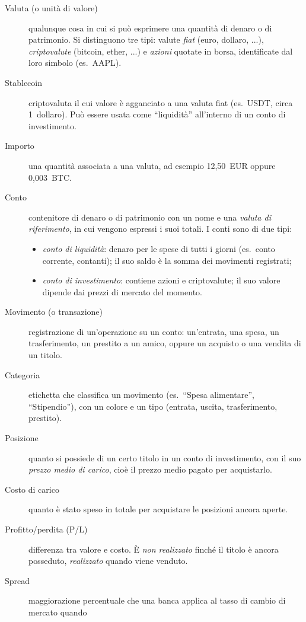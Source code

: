 \documentclass[11pt,a4paper,openright]{report}
\begin{document}
\begin{description}
  \item[Valuta (o unità di valore)] qualunque cosa in cui si può esprimere una quantità di denaro o di
  patrimonio. Si distinguono tre tipi: valute \emph{fiat} (euro, dollaro, ...), \emph{criptovalute}
  (bitcoin, ether, ...) e \emph{azioni} quotate in borsa, identificate dal loro simbolo (es.\ AAPL).
  \item[Stablecoin] criptovaluta il cui valore è agganciato a una valuta fiat (es.\ USDT, circa
  1~dollaro). Può essere usata come ``liquidità'' all'interno di un conto di investimento.
  \item[Importo] una quantità associata a una valuta, ad esempio 12,50~EUR oppure 0,003~BTC.
  \item[Conto] contenitore di denaro o di patrimonio con un nome e una \emph{valuta di riferimento}, in
  cui vengono espressi i suoi totali. I conti sono di due tipi:
  \begin{itemize}
    \item \emph{conto di liquidità}: denaro per le spese di tutti i giorni (es.\ conto corrente,
    contanti); il suo saldo è la somma dei movimenti registrati;
    \item \emph{conto di investimento}: contiene azioni e criptovalute; il suo valore dipende dai
    prezzi di mercato del momento.
  \end{itemize}
  \item[Movimento (o transazione)] registrazione di un'operazione su un conto: un'entrata, una spesa, un
  trasferimento, un prestito a un amico, oppure un acquisto o una vendita di un titolo.
  \item[Categoria] etichetta che classifica un movimento (es.\ ``Spesa alimentare'', ``Stipendio''), con
  un colore e un tipo (entrata, uscita, trasferimento, prestito).
  \item[Posizione] quanto si possiede di un certo titolo in un conto di investimento, con il suo
  \emph{prezzo medio di carico}, cioè il prezzo medio pagato per acquistarlo.
  \item[Costo di carico] quanto è stato speso in totale per acquistare le posizioni ancora aperte.
  \item[Profitto/perdita (P/L)] differenza tra valore e costo. È \emph{non realizzato} finché il titolo
  è ancora posseduto, \emph{realizzato} quando viene venduto.
  \item[Spread] maggiorazione percentuale che una banca applica al tasso di cambio di mercato quando

\end{description}
\end{document}

